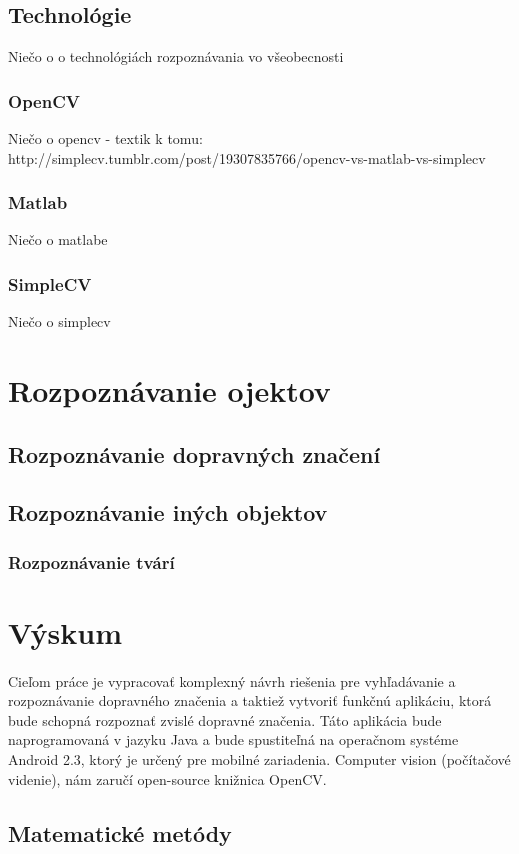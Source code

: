 \documentclass[12pt]{article}
\begin{document}
\subsection{Technológie}
Niečo o o technológiách rozpoznávania vo všeobecnosti
\subsubsection{OpenCV}
Niečo o opencv - textik k tomu:
http://simplecv.tumblr.com/post/19307835766/opencv-vs-matlab-vs-simplecv
\subsubsection{Matlab}
Niečo o matlabe
\subsubsection{SimpleCV}
Niečo o simplecv
\section{Rozpoznávanie ojektov}
\subsection{Rozpoznávanie dopravných značení}
\subsection{Rozpoznávanie iných objektov}
\subsubsection{Rozpoznávanie tvárí}
\section{Výskum}
\paragraph{}
Cieľom práce je vypracovať komplexný návrh riešenia pre vyhľadávanie a rozpoznávanie dopravného značenia a taktiež vytvoriť funkčnú aplikáciu, ktorá
bude schopná rozpoznať zvislé dopravné značenia. Táto aplikácia bude naprogramovaná v jazyku Java a bude spustiteľná na
 operačnom systéme Android 2.3, ktorý je určený pre mobilné zariadenia. Computer vision (počítačové videnie), nám zaručí open-source knižnica OpenCV.
\subsection{Matematické metódy}
\end{document}

